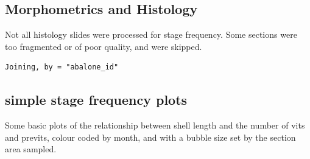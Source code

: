 \documentclass[]{article}
\newenvironment{Shaded}{\begin{snugshade}}{\end{snugshade}}
\newcommand{\CommentTok}[1]{\textcolor[rgb]{0.56,0.35,0.01}{\textit{#1}}}
\newcommand{\DataTypeTok}[1]{\textcolor[rgb]{0.13,0.29,0.53}{#1}}
\newcommand{\DecValTok}[1]{\textcolor[rgb]{0.00,0.00,0.81}{#1}}
\newcommand{\FloatTok}[1]{\textcolor[rgb]{0.00,0.00,0.81}{#1}}
\newcommand{\KeywordTok}[1]{\textcolor[rgb]{0.13,0.29,0.53}{\textbf{#1}}}
\newcommand{\NormalTok}[1]{#1}
\newcommand{\OperatorTok}[1]{\textcolor[rgb]{0.81,0.36,0.00}{\textbf{#1}}}
\newcommand{\StringTok}[1]{\textcolor[rgb]{0.31,0.60,0.02}{#1}}
\begin{document}
\hypertarget{morphometrics-and-histology-1}{%
\subsection{Morphometrics and
Histology}\label{morphometrics-and-histology-1}}

Not all histology slides were processed for stage frequency. Some
sections were too fragmented or of poor quality, and were skipped.

\begin{Shaded}
\end{Shaded}

\begin{verbatim}
Joining, by = "abalone_id"
\end{verbatim}

\hypertarget{simple-stage-frequency-plots}{%
\subsection{simple stage frequency
plots}\label{simple-stage-frequency-plots}}

Some basic plots of the relationship between shell length and the number
of vits and previts, colour coded by month, and with a bubble size set
by the section area sampled.

\begin{Shaded}
\end{Shaded}
\end{document}
